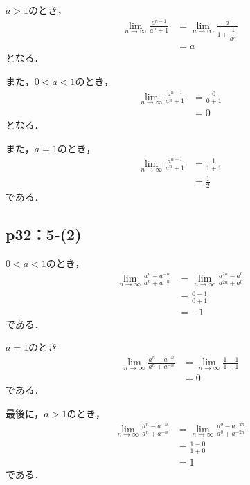 \documentclass[uplatex,dvipdfmx,a4paper,10pt,fleqn]{jsarticle}
\newenvironment{tleftbar}{\begin{tbleftline}\setlength{\parindent}{1zw}}{\end{tbleftline}}
\begin{document}
\begin{tleftbar}
    $a>1$のとき，
    \begin{align*} 
        \lim_{n \to \infty} \frac{a^{n+1}}{a^n +1} & = \lim_{n \to \infty} \frac{a}{1+\dfrac{1}{a^n}} \\
        & = a 
    \end{align*} 
    となる．
    
    また，$0<a<1$のとき，
    \begin{align*} 
        \lim_{n \to \infty} \frac{a^{n+1}}{a^n +1} & = \frac{0}{0+1} \\
        & =0 
    \end{align*} 
    となる．

    また，$a=1$のとき，
    \begin{align*}
    \lim_{n \to \infty} \frac{a^{n+1}}{a^n +1} & = \frac{1}{1+1} \\
    & =\frac{1}{2}
    \end{align*}
    である．
\end{tleftbar}

\subsection*{p32：5-(2)}

\begin{tleftbar} 
    $ 0 < a <1 $のとき，
    \begin{align*} 
        \lim_{n \to \infty} \frac{a^n - a^{-n}}{a^n + a^{-n}} & =\lim_{n \to \infty} \frac{a^{2n} - a^{0}}{a^{2n} + a^{0}} \\
        & = \frac{0-1}{0+1} \\
        & = -1 
    \end{align*} 
    である．

    $a=1$のとき
    \begin{align*}
    \lim_{n \to \infty} \frac{a^n - a^{-n}}{a^n + a^{-n}} & =  \lim_{n \to \infty} \frac{1-1}{1+1} \\
    & = 0
    \end{align*} 
    である．

    最後に，$a>1$のとき，
    \begin{align*} 
    \lim_{n \to \infty} \frac{a^n - a^{-n}}{a^n + a^{-n}} & =  \lim_{n \to \infty} \frac{a^0 - a^{-2n}}{a^0 + a^{-2n}} \\
    & = \frac{1-0}{1+0} \\
    & = 1 
    \end{align*}
    である．
\end{tleftbar}
\end{document}
